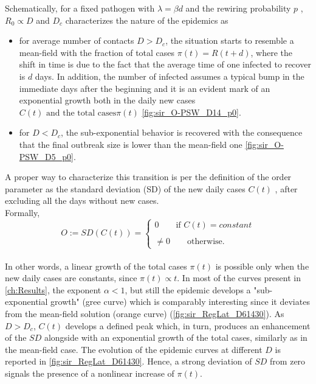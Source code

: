 \documentclass[a4paper,10pt,twoside]{book} %
\theoremstyle{definition}
\begin{document}
Schematically, for a fixed pathogen with $\lambda = \beta d$ and the rewiring probability $p$ , $R_0 \propto D$ and $D_c$ characterizes the nature of the epidemics as \cite{Thurner::NetBasedExpl}
\begin{itemize}
	\item for average number of contacts $D>D_c$, the situation starts to resemble a mean-field with the fraction of total cases $\pi(t) = R(t+d)$, where the shift in time is due to the fact that the average time of one infected to recover is $d$ days. In addition, the number of infected assumes a typical bump in the immediate days after the beginning and it is an evident mark of an exponential growth both in the daily new cases $C(t) \text{ and the total cases} \pi(t)$ \autoref{fig:sir_O-PSW_D14_p0}.
	\item for $D<D_c$, the sub-exponential behavior is recovered with the consequence that the final outbreak size is lower than the mean-field one \autoref{fig:sir_O-PSW_D5_p0}.
\end{itemize}
A proper way to characterize this transition is per the definition of the order parameter \cite{Thurner::NetBasedExpl} as the standard deviation (SD) of the new daily cases $ C(t)$ , after excluding all the days without new cases.
\\Formally,
\begin{equation}
	O := SD(C(t)) = 
	\begin{cases}
		0 \qquad \text{if $C(t) = constant$}\\\\
		\neq 0 \qquad \text{otherwise.} 
	\end{cases}
	\label{eq:def_OrdP}
\end{equation}
\\In other words, a linear growth of the total cases $ \pi(t)$ is possible only when the new daily cases are constants, since $\pi(t) \propto t$. In most of the curves present in \autoref{ch:Results}, the exponent $ \alpha < 1$, but still the epidemic develops a "sub-exponential growth" (gree curve) which is comparably interesting since it deviates from the mean-field solution (orange curve) (\autoref{fig:sir_RegLat_D61430}).  
As $D > D_c$, $C(t)$ develops a defined peak which, in turn, produces an enhancement of the $SD$ alongside with an exponential growth of the total cases, similarly as in the mean-field case. The evolution of the epidemic curves at different $D$ is reported in \autoref{fig:sir_RegLat_D61430}. Hence, a strong deviation of $SD$ from zero signals the presence of a nonlinear increase of $\pi(t)$.
\end{document}
